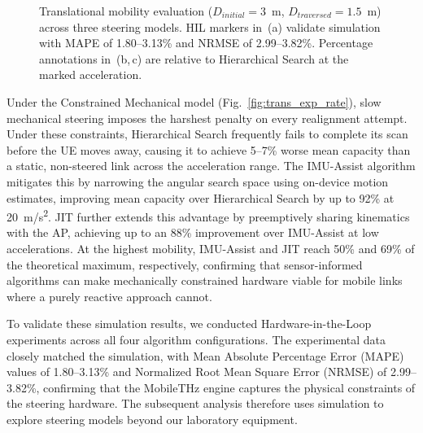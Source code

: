 \documentclass[fleqn,10pt]{wlscirep}
\newcommand{\legmark}[2]{%
    \tikz[baseline=-0.5ex]{
        \node[#2, fill=#1, draw=#1, inner sep=2pt, scale=0.8] at (0,0) {};
    }%
}
\begin{document}
\begin{figure}[ht!]

    \caption{Translational mobility evaluation ($D_{initial} = 3$~m, $D_{traversed} = 1.5$~m) across three steering models. HIL markers in~(a) validate simulation with MAPE of 1.80--3.13\% and NRMSE of 2.99--3.82\%. Percentage annotations in~(b,\,c) are relative to Hierarchical Search at the marked acceleration.}
    \label{fig:translational_rate}
    \vspace{-5pt}
\end{figure}

Under the Constrained Mechanical model (Fig.~\ref{fig:trans_exp_rate}), slow mechanical steering imposes the harshest penalty on every realignment attempt. Under these constraints, Hierarchical Search frequently fails to complete its scan before the UE moves away, causing it to achieve 5–7\% worse mean capacity than a static, non-steered link across the acceleration range. The IMU-Assist algorithm mitigates this by narrowing the angular search space using on-device motion estimates, improving mean capacity over Hierarchical Search by up to 92\% at \SI{20}{m/s^2}. JIT further extends this advantage by preemptively sharing kinematics with the AP, achieving up to an 88\% improvement over IMU-Assist at low accelerations. At the highest mobility, IMU-Assist and JIT reach 50\% and 69\% of the theoretical maximum, respectively, confirming that sensor-informed algorithms can make mechanically constrained hardware viable for mobile links where a purely reactive approach cannot.

To validate these simulation results, we conducted Hardware-in-the-Loop experiments across all four algorithm configurations. The experimental data closely matched the simulation, with Mean Absolute Percentage Error (MAPE) values of 1.80--3.13\% and Normalized Root Mean Square Error (NRMSE) of 2.99--3.82\%, confirming that the MobileTHz engine captures the physical constraints of the steering hardware. The subsequent analysis therefore uses simulation to explore steering models beyond our laboratory equipment.
\end{document}

